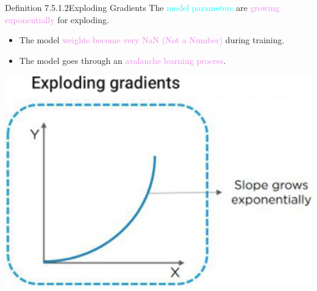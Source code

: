 \documentclass{book}
\begin{document}
\begin{defBox}{Definition 7.5.1.2}{Exploding Gradients}
    The \textcolor{cyan}{model parameters} are \textcolor{violet}{growing exponentially} for exploding.
    \begin{itemize}
        \item The model \textcolor{violet}{weights become very NaN (Not a Number)} during training.
        \item The model goes through an \textcolor{violet}{avalanche learning process}.
    \end{itemize}
    \begin{center}
        \includegraphics[scale=0.15]{chapter 7/ch7_figure22.jpeg}
    \end{center}
\end{defBox}
\end{document}
